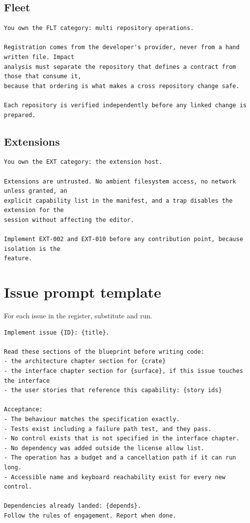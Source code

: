 \subsection{Fleet}
\begin{lstlisting}
You own the FLT category: multi repository operations.

Registration comes from the developer's provider, never from a hand written file. Impact
analysis must separate the repository that defines a contract from those that consume it,
because that ordering is what makes a cross repository change safe.

Each repository is verified independently before any linked change is prepared.
\end{lstlisting}

\subsection{Extensions}
\begin{lstlisting}
You own the EXT category: the extension host.

Extensions are untrusted. No ambient filesystem access, no network unless granted, an
explicit capability list in the manifest, and a trap disables the extension for the
session without affecting the editor.

Implement EXT-002 and EXT-010 before any contribution point, because isolation is the
feature.
\end{lstlisting}

\section{Issue prompt template}

For each issue in the register, substitute and run.

\begin{lstlisting}
Implement issue {ID}: {title}.

Read these sections of the blueprint before writing code:
- the architecture chapter section for {crate}
- the interface chapter section for {surface}, if this issue touches the interface
- the user stories that reference this capability: {story ids}

Acceptance:
- The behaviour matches the specification exactly.
- Tests exist including a failure path test, and they pass.
- No control exists that is not specified in the interface chapter.
- No dependency was added outside the license allow list.
- The operation has a budget and a cancellation path if it can run long.
- Accessible name and keyboard reachability exist for every new control.

Dependencies already landed: {depends}.
Follow the rules of engagement. Report when done.
\end{lstlisting}


